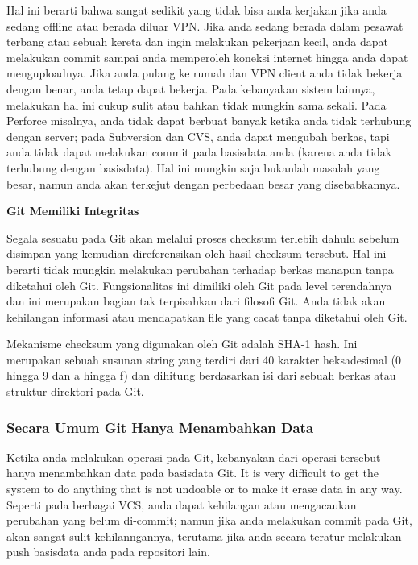 Hal ini berarti bahwa sangat sedikit yang tidak bisa anda kerjakan jika 
anda sedang offline atau berada diluar VPN. Jika anda sedang berada 
dalam pesawat terbang atau sebuah kereta dan ingin melakukan pekerjaan 
kecil, anda dapat melakukan commit sampai anda memperoleh koneksi 
internet hingga anda dapat menguploadnya. Jika anda pulang ke rumah dan 
VPN client anda tidak bekerja dengan benar, anda tetap dapat bekerja. 
Pada kebanyakan sistem lainnya, melakukan hal ini cukup sulit atau 
bahkan tidak mungkin sama sekali. Pada Perforce misalnya, anda tidak 
dapat berbuat banyak ketika anda tidak terhubung dengan server; pada 
Subversion dan CVS, anda dapat mengubah berkas, tapi anda tidak dapat 
melakukan commit pada basisdata anda (karena anda tidak terhubung dengan 
basisdata). Hal ini mungkin saja bukanlah masalah yang besar, namun anda 
akan terkejut dengan perbedaan besar yang disebabkannya.\vspace{12pt}

\textbf{Git Memiliki Integritas}\vspace{12pt}

Segala sesuatu pada Git akan melalui proses checksum terlebih dahulu 
sebelum disimpan yang kemudian direferensikan oleh hasil checksum 
tersebut. Hal ini berarti tidak mungkin melakukan perubahan terhadap 
berkas manapun tanpa diketahui oleh Git. Fungsionalitas ini dimiliki 
oleh Git pada level terendahnya dan ini merupakan bagian tak terpisahkan 
dari filosofi Git. Anda tidak akan kehilangan informasi atau mendapatkan 
file yang cacat tanpa diketahui oleh Git.\vspace{12pt}

Mekanisme checksum yang digunakan oleh Git adalah SHA-1 hash. Ini 
merupakan sebuah susunan string yang terdiri dari 40 karakter 
heksadesimal (0 hingga 9 dan a hingga f) dan dihitung berdasarkan isi 
dari sebuah berkas atau struktur direktori pada Git.\vspace{12pt}

\subsubsection{Secara Umum Git Hanya Menambahkan Data}\vspace{12pt}
Ketika anda melakukan operasi pada Git, kebanyakan dari operasi tersebut 
hanya menambahkan data pada basisdata Git. It is very difficult to get 
the system to do anything that is not undoable or to make it erase data 
in any way. Seperti pada berbagai VCS, anda dapat kehilangan atau 
mengacaukan perubahan yang belum di-commit; namun jika anda melakukan 
commit pada Git, akan sangat sulit kehilanngannya, terutama jika anda 
secara teratur melakukan push basisdata anda pada repositori lain.\vspace{12pt}

